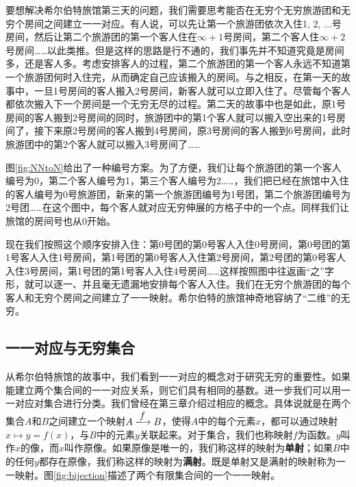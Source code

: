 \documentclass{article}
\begin{document}
要想解决希尔伯特旅馆第三天的问题，我们需要思考能否在无穷个无穷旅游团和无穷个房间之间建立一一对应。有人说，可以先让第一个旅游团依次入住1, 2, ...号房间，然后让第二个旅游团的第一个客人住在$\infty + 1$号房间，第二个客人住$\infty + 2$号房间……以此类推。但是这样的思路是行不通的，我们事先并不知道究竟是房间多，还是客人多。考虑安排客人的过程，第二个旅游团的第一个客人永远不知道第一个旅游团何时入住完，从而确定自己应该搬入的房间。与之相反，在第一天的故事中，一旦1号房间的客人搬入2号房间，新客人就可以立即入住了。尽管每个客人都依次搬入下一个房间是一个无穷无尽的过程。第二天的故事中也是如此，原1号房间的客人搬到2号房间的同时，旅游团中的第1个客人就可以搬入空出来的1号房间了，接下来原2号房间的客人搬到4号房间，原3号房间的客人搬到6号房间，此时旅游团中的第2个客人就可以搬入3号房间了……

图\ref{fig:NNtoN}给出了一种编号方案。为了方便，我们让每个旅游团的第一个客人编号为0，第二个客人编号为1，第三个客人编号为2……，我们把已经在旅馆中入住的客人编号为0号旅游团，新来的第一个旅游团编号为1号团，第二个旅游团编号为2号团……在这个图中，每个客人就对应无穷伸展的方格子中的一个点。同样我们让旅馆的房间号也从0开始。

现在我们按照这个顺序安排入住：第0号团的第0号客人入住0号房间，第0号团的第1号客人入住1号房间，第1号团的第0号客人入住第2号房间，第2号团的第0号客人入住3号房间，第1号团的第1号客人入住4号房间……这样按照图中往返画“之”字形，就可以逐一、并且毫无遗漏地安排每个客人入住。我们在无穷个旅游团的每个客人和无穷个房间之间建立了一一映射。希尔伯特的旅馆神奇地容纳了“二维”的无穷。

\begin{Exercise}
\end{Exercise}

\subsection{一一对应与无穷集合}

从希尔伯特旅馆的故事中，我们看到一一对应的概念对于研究无穷的重要性。如果能建立两个集合间的一一对应关系，则它们具有相同的基数。进一步我们可以用一一对应对集合进行分类。我们曾经在第三章介绍过相应的概念。具体说就是在两个集合$A$和$B$之间建立一个映射$A \arrowto{f} B$，使得$A$中的每个元素$x$，都可以通过映射$x \mapsto y = f(x)$，与$B$中的元素$y$关联起来。对于集合，我们也称映射$f$为函数。$y$叫作$x$的像，而$x$叫作原像。如果原像是唯一的，我们称这样的映射为\textbf{单射}；如果$B$中的任何$y$都存在原像，我们称这样的映射为\textbf{满射}。既是单射又是满射的映射称为一一映射。图\ref{fig:bijection}描述了两个有限集合间的一个一一映射。
\end{document}
